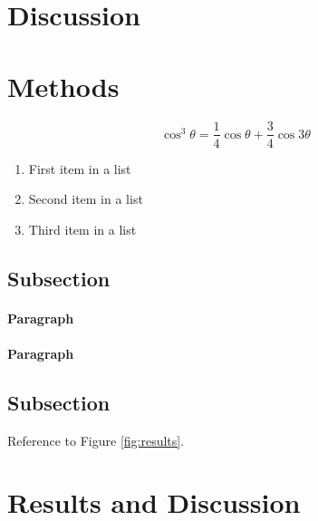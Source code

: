 \documentclass[fleqn,10pt]{SelfArx} %
\begin{document}
\section*{Discussion}
\lipsum[2]

\section{Methods}


\lipsum[4] %


\lipsum[4] %


\begin{equation}
\cos^3 \theta =\frac{1}{4}\cos\theta+\frac{3}{4}\cos 3\theta
\label{eq:refname2}
\end{equation}

\lipsum[5] %

\begin{enumerate}[noitemsep] %
\item First item in a list
\item Second item in a list
\item Third item in a list
\end{enumerate}

\subsection{Subsection}

\lipsum[6] %

\paragraph{Paragraph} \lipsum[7] %
\paragraph{Paragraph} \lipsum[8] %

\subsection{Subsection}

\lipsum[9] %

Reference to Figure \ref{fig:results}.


\section{Results and Discussion}
\end{document}
